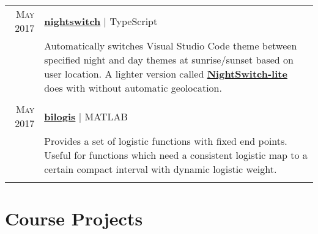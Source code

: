 \documentclass[letter,10pt]{article} %
\begin{document}
\begin{tabular}{r|p{9.5cm}}

\textsc{May} 2017 & \textbf{\href{https://github.com/gharveymn/nightswitch}{\color{black}nightswitch}} | TypeScript \\
& \footnotesize{Automatically switches Visual Studio Code theme between specified night and day themes at sunrise/sunset based on user location. A lighter version called \textbf{\href{https://github.com/gharveymn/nightswitch-lite}{\color{black}NightSwitch-lite}} does with without automatic geolocation.}\\
\multicolumn{2}{c}{} \vspace{-1ex}\\


\textsc{May} 2017 & \textbf{\href{https://github.com/gharveymn/bilogis}{\color{black}bilogis}} | MATLAB \\
& \footnotesize{Provides a set of logistic functions with fixed end points. Useful for functions which need a consistent logistic map to a certain compact interval with dynamic logistic weight.}\\
\multicolumn{2}{c}{} \vspace{-1ex}\\
\end{tabular}


\section{Course Projects}
\end{document}
